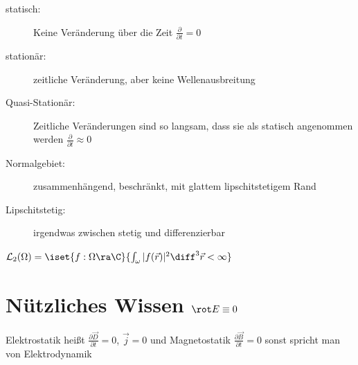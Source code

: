 \documentclass[german, fourcolumn, 6pt]{latex4ei/latex4ei_sheet}
\begin{document}
    \begin{description}
    \item[statisch:] Keine Veränderung über die Zeit $\frac{\partial}{\partial t} = 0$
    \item[stationär:] zeitliche Veränderung, aber keine Wellenausbreitung
    \item[Quasi-Stationär:] Zeitliche Veränderungen sind so langsam, dass sie als statisch angenommen werden $\frac{\partial}{\partial t} \approx 0$
    \item[Normalgebiet:] zusammenhängend, beschränkt, mit glattem lipschitstetigem Rand
    \item[Lipschitstetig:] irgendwas zwischen stetig und differenzierbar
    \end{description}
$\mathcal L_2(\Omega) = \iset{f:\Omega \ra \C}{\int_\omega |f(\vec r)|^2 \diff^3 \vec r < \infty }$\\

    \section{Nützliches Wissen $\rot E \equiv 0$}
    Elektrostatik heißt $\frac{\partial \vec D}{\partial t} = 0$, $\vec j = 0$ und Magnetostatik $\frac{\partial \vec B}{\partial t} = 0$ sonst spricht man von Elektrodynamik



\label{LastPage}
\end{document}
